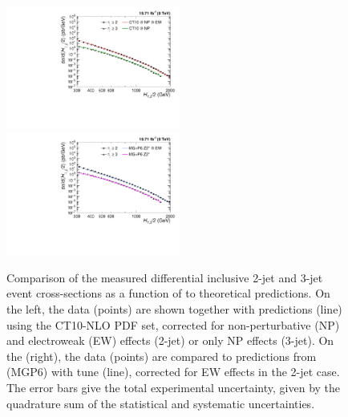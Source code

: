 \begin{figure}[!h]
 \hspace*{-5mm}\includegraphics[width=0.51\textwidth]{Plots_HT_2_150/Comparison_data_theory_EW.pdf}%
 ~~\includegraphics[width=0.51\textwidth]{Plots_HT_2_150/Comparison_data_MC_EW.pdf}\\
 \caption[Comparison of the measured differential inclusive 2-jet and 3-jet event cross-sections as a function of \httwo to theoretical predictions.]{Comparison of the measured differential inclusive 2-jet and 3-jet event cross-sections as a function of \httwo to theoretical predictions. On the left, the data (points) are shown together with \NLOJETPP predictions (line) using the CT10-NLO PDF set, corrected for non-perturbative (NP) and electroweak (EW) effects (2-jet) or only NP effects (3-jet). On the (right), the data (points) are compared to predictions from \MadGraphFn \plusn \PYTHIAS (MG\plusn P6) with tune \Ztwostar (line), corrected for EW effects in the 2-jet case. The error bars give the total experimental uncertainty, given by the quadrature sum of the statistical and systematic uncertainties.}
 \label{fig:data_NL0_MC}
\end{figure}

